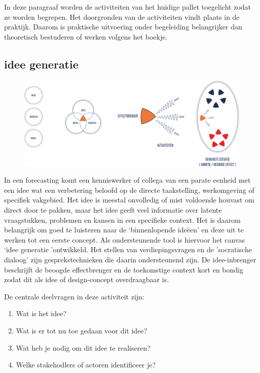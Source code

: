 \documentclass[
]{book}
\providecommand{\tightlist}{%
  \setlength{\itemsep}{0pt}\setlength{\parskip}{0pt}}
\begin{document}
In deze paragraaf worden de activiteiten van het huidige pallet toegelicht zodat ze worden begrepen. Het doorgronden van de activiteiten vindt plaats in de praktijk. Daarom is praktische uitvoering onder begeleiding belangrijker dan theoretisch bestuderen of werken volgens het boekje.

\hypertarget{idee-generatie}{%
\subsection{idee generatie}\label{idee-generatie}}

\begin{figure}
\includegraphics[width=40.67in]{data/images/20210401-MDI-ideegeneratie} \caption{ }\label{fig:unnamed-chunk-18}
\end{figure}

In een forecasting komt een kenniswerker of collega van een parate eenheid met een idee wat een verbetering beloofd op de directe taakstelling, werkomgeving of specifiek vakgebied. Het idee is meestal onvolledig of mist voldoende houvast om direct door te pakken, maar het idee geeft veel informatie over latente vraagstukken, problemen en kansen in een specifieke context. Het is daarom belangrijk om goed te luisteren naar de `binnenlopende ideëen' en deze uit te werken tot een eerste concept. Als ondersteunende tool is hiervoor het canvas `idee generatie 'ontwikkeld. Het stellen van verdiepingsvragen en de 'socratische dialoog' zijn gesprekstechnieken die daarin ondersteunend zijn. De idee-inbrenger beschrijft de beoogde effectbrenger en de toekomstige context kort en bondig zodat dit als idee of design-concept overdraagbaar is.

De centrale deelvragen in deze activiteit zijn:

\begin{enumerate}
\def\labelenumi{\arabic{enumi}.}
\tightlist
\item
  Wat is het idee?
\item
  Wat is er tot nu toe gedaan voor dit idee?
\item
  Wat heb je nodig om dit idee te realiseren?
\item
  Welke stakehodlers of actoren identificeer je?
\end{enumerate}
\end{document}
